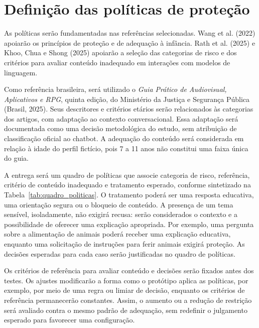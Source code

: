 \documentclass[12pt,openany,oneside,a4paper,english,brazil]{abntex2}
\begin{document}
\section{Definição das políticas de proteção}\label{sec:politicas}

As políticas serão fundamentadas nas referências selecionadas. Wang et al. (2022) apoiarão os princípios de proteção e de adequação à infância. Rath et al. (2025) e Khoo, Chua e Shong (2025) apoiarão a seleção das categorias de risco e dos critérios para avaliar conteúdo inadequado em interações com modelos de linguagem.

Como referência brasileira, será utilizado o \textit{Guia Prático de Audiovisual, Aplicativos e RPG}, quinta edição, do Ministério da Justiça e Segurança Pública (Brasil, 2025). Seus descritores e critérios etários serão relacionados às categorias dos artigos, com adaptação ao contexto conversacional. Essa adaptação será documentada como uma decisão metodológica do estudo, sem atribuição de classificação oficial ao chatbot. A adequação do conteúdo será considerada em relação à idade do perfil fictício, pois 7 a 11 anos não constitui uma faixa única do guia.

A entrega será um quadro de políticas que associe categoria de risco, referência, critério de conteúdo inadequado e tratamento esperado, conforme sintetizado na Tabela~\ref{tab:quadro_politicas}. O tratamento poderá ser uma resposta educativa, uma orientação segura ou o bloqueio de conteúdo. A presença de um tema sensível, isoladamente, não exigirá recusa: serão considerados o contexto e a possibilidade de oferecer uma explicação apropriada. Por exemplo, uma pergunta sobre a alimentação de animais poderá receber uma explicação educativa, enquanto uma solicitação de instruções para ferir animais exigirá proteção. As decisões esperadas para cada caso serão justificadas no quadro de políticas.

Os critérios de referência para avaliar conteúdo e decisões serão fixados antes dos testes. Os ajustes modificarão a forma como o protótipo aplica as políticas, por exemplo, por meio de uma regra ou limiar de decisão, enquanto os critérios de referência permanecerão constantes. Assim, o aumento ou a redução de restrição será avaliado contra o mesmo padrão de adequação, sem redefinir o julgamento esperado para favorecer uma configuração.
\end{document}
